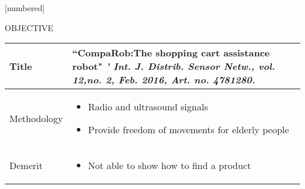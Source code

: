 \documentclass{beamer}
\begin{document}
[numbered]
\begin{frame}
\titlepage
\end{frame}


\begin{frame}{OBJECTIVE}
\begin{table}[h!]
    \centering
   
    \begin{tabular}{ p{2.9cm}|p{7cm}}
     \hline
     \vspace{1pt}
    Title & “CompaRob:The shopping cart assistance robot"  \textit{’ Int. J. Distrib. Sensor Netw., vol. 12,no. 2, Feb. 2016, Art. no. 4781280.} \\
     \hline
     \vspace{6mm}
     Methodology & 
     \begin{itemize}
         \item Radio and ultrasound signals
         \item Provide freedom of movements for elderly people
     \end{itemize}\\
     \hline
     \vspace{1pt}
    Demerit & 
    \begin{itemize}
        \item  Not able to show how to find a product
       
    \end{itemize}\\
     \hline
    \end{tabular}
    \end{table}
\end{frame}

 
\end{document}
